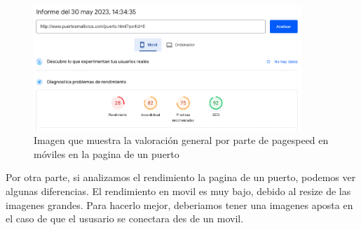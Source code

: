 \documentclass{article}
\begin{document}
\begin{figure}[ht]
    \centering
    \includegraphics[width=0.9\textwidth]{images/rendimentPort2.png}
    \caption{Imagen que muestra la valoración general por parte de pagespeed en móviles en la pagina de un puerto}
\end{figure}
\noindent Por otra parte, si analizamos el rendimiento la pagina de un puerto, podemos ver algunas diferencias. El rendimiento en movil es muy bajo, debido al resize de las imagenes grandes. Para hacerlo mejor, deberiamos tener una imagenes aposta en el caso de que el ususario se conectara des de un movil.
\newpage
\end{document}
